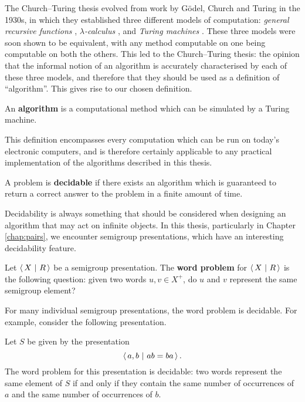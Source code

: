 The Church--Turing thesis evolved from work by G\"{o}del, Church and Turing in
the 1930s, in which they established three different models of computation:
\textit{general recursive functions} \cite{godel}, \textit{$\lambda$-calculus}
\cite{church}, and \textit{Turing machines} \cite{turing}.  These three models
were soon shown to be equivalent, with any method computable on one being
computable on both the others.  This led to the Church--Turing thesis: the
opinion that the informal notion of an algorithm is accurately characterised by
each of these three models, and therefore that they should be used as a
definition of ``algorithm''.  This gives rise to our chosen definition.

\begin{definition}
  \label{def:algorithm}
  An \textbf{algorithm} is a computational method which can be simulated by a
  Turing machine.
\end{definition}

This definition encompasses every computation which can be run on today's
electronic computers, and is therefore certainly applicable to any practical
implementation of the algorithms described in this thesis.

\begin{definition}
  \label{def:decidable}
  A problem is \textbf{decidable} if there exists an algorithm which is
  guaranteed to return a correct answer to the problem in a finite amount of
  time.
\end{definition}

Decidability is always something that should be considered when designing an
algorithm that may act on infinite objects.  In this thesis, particularly in
Chapter \ref{chap:pairs}, we encounter semigroup presentations, which have an
interesting decidability feature.

\begin{definition}
  \label{def:word-problem}
  Let $\left\langle\,X ~\middle|~ R\,\right\rangle$ be a semigroup presentation.  The \textbf{word problem} for
  $\left\langle\,X ~\middle|~ R\,\right\rangle$ is the following question: given two words $u, v \in X^+$, do $u$
  and $v$ represent the same semigroup element?
\end{definition}

For many individual semigroup presentations, the word problem is decidable.  For
example, consider the following presentation.

\begin{example}
  \label{ex:presentation-decidable}
  Let $S$ be given by the presentation
  $$\left\langle\,a,b ~\middle|~ ab=ba\,\right\rangle.$$
  The word problem for this presentation is decidable: two words represent the
  same element of $S$ if and only if they contain the same number of occurrences
  of $a$ and the same number of occurrences of $b$.
\end{example}


